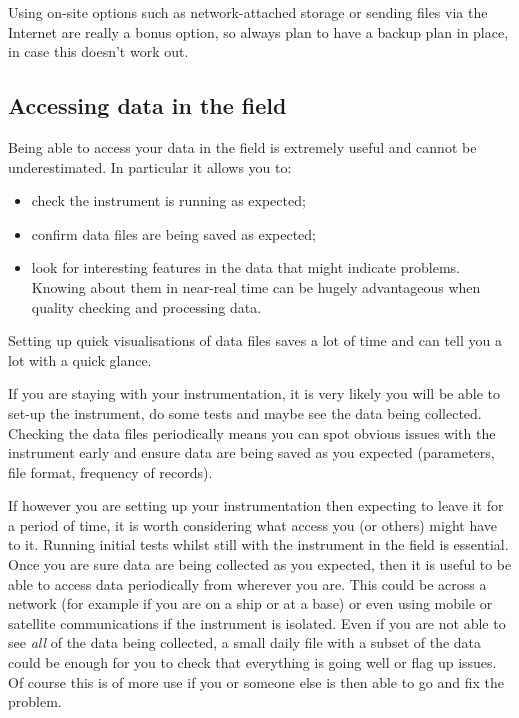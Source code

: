 \documentclass[12pt,a4paper,oneside]{report}
\providecommand{\tightlist}{%
  \setlength{\itemsep}{0pt}\setlength{\parskip}{0pt}}
\begin{document}
Using on-site options such as network-attached storage or sending files
via the Internet are really a bonus option, so always plan to have a
backup plan in place, in case this doesn't work out.

\hypertarget{accessing-data-in-the-field}{%
\subsection{Accessing data in the
field}\label{accessing-data-in-the-field}}

Being able to access your data in the field is extremely useful and
cannot be underestimated. In particular it allows you to:

\begin{itemize}
\tightlist
\item
  check the instrument is running as expected;
\item
  confirm data files are being saved as expected;
\item
  look for interesting features in the data that might indicate
  problems. Knowing about them in near-real time can be hugely
  advantageous when quality checking and processing data.
\end{itemize}

Setting up quick visualisations of data files saves a lot of time and
can tell you a lot with a quick glance.

If you are staying with your instrumentation, it is very likely you will
be able to set-up the instrument, do some tests and maybe see the data
being collected. Checking the data files periodically means you can spot
obvious issues with the instrument early and ensure data are being saved
as you expected (parameters, file format, frequency of records).

If however you are setting up your instrumentation then expecting to
leave it for a period of time, it is worth considering what access you
(or others) might have to it. Running initial tests whilst still with
the instrument in the field is essential. Once you are sure data are
being collected as you expected, then it is useful to be able to access
data periodically from wherever you are. This could be across a network
(for example if you are on a ship or at a base) or even using mobile or
satellite communications if the instrument is isolated. Even if you are
not able to see \emph{all} of the data being collected, a small daily
file with a subset of the data could be enough for you to check that
everything is going well or flag up issues. Of course this is of more
use if you or someone else is then able to go and fix the problem.
\end{document}
